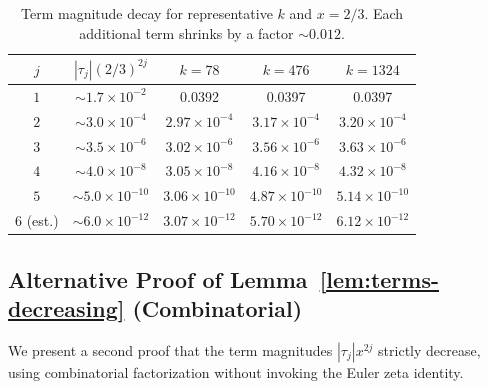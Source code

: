 \documentclass[12pt,a4paper]{article}
\theoremstyle{plain}
\theoremstyle{definition}
\begin{document}
\begin{table}[htbp]
\centering
\caption{Term magnitude decay for representative $k$ and $x = 2/3$.
  Each additional term shrinks by a factor $\sim 0.012$.}
\label{tab:term-decay}
\begin{tabular}{ccccc}
\toprule
$j$ & $|\tau_j|(2/3)^{2j}$ & $k=78$ & $k=476$ & $k=1324$ \\
\midrule
$1$ & $\sim 1.7 \times 10^{-2}$ & 0.0392 & 0.0397 & 0.0397 \\
$2$ & $\sim 3.0 \times 10^{-4}$ & $2.97 \times 10^{-4}$ & $3.17 \times 10^{-4}$ & $3.20 \times 10^{-4}$ \\
$3$ & $\sim 3.5 \times 10^{-6}$ & $3.02 \times 10^{-6}$ & $3.56 \times 10^{-6}$ & $3.63 \times 10^{-6}$ \\
$4$ & $\sim 4.0 \times 10^{-8}$ & $3.05 \times 10^{-8}$ & $4.16 \times 10^{-8}$ & $4.32 \times 10^{-8}$ \\
$5$ & $\sim 5.0 \times 10^{-10}$ & $3.06 \times 10^{-10}$ & $4.87 \times 10^{-10}$ & $5.14 \times 10^{-10}$ \\
$6$ (est.) & $\sim 6.0 \times 10^{-12}$ & $3.07 \times 10^{-12}$ & $5.70 \times 10^{-12}$ & $6.12 \times 10^{-12}$ \\
\bottomrule
\end{tabular}
\end{table}

\subsection*{Alternative Proof of Lemma~\ref{lem:terms-decreasing} (Combinatorial)}
\label{sec:alt-lemma81}

We present a second proof that the term magnitudes $|\tau_j| x^{2j}$
strictly decrease, using combinatorial factorization without invoking
the Euler zeta identity.
\end{document}
